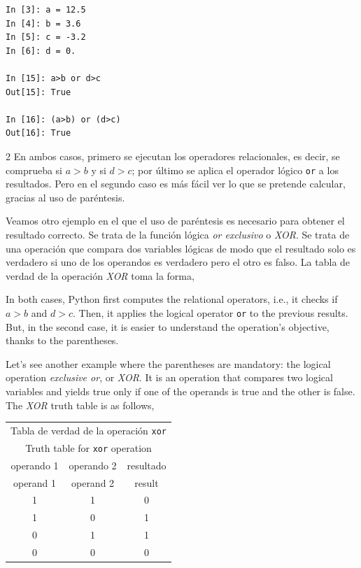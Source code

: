 \begin{center}
    \begin{minipage}{.2\textwidth}
\begin{verbatim}
In [3]: a = 12.5
In [4]: b = 3.6
In [5]: c = -3.2
In [6]: d = 0.

In [15]: a>b or d>c
Out[15]: True

In [16]: (a>b) or (d>c)
Out[16]: True
\end{verbatim}
\end{minipage}
\end{center}

\begin{paracol}{2}
En ambos casos, primero se ejecutan los operadores relacionales, es decir, se comprueba si $a>b$ y si $d>c$; por último se aplica el operador lógico \texttt{or} a los resultados. Pero en el segundo caso es más fácil ver lo que se pretende calcular, gracias al uso de paréntesis.

Veamos otro ejemplo en el que el uso de paréntesis es necesario para obtener el resultado correcto. Se trata de la función lógica \emph{or exclusivo} o \emph{XOR}. Se trata de una operación que compara dos variables lógicas de modo que el resultado solo es verdadero si uno de los operandos es verdadero pero el otro es falso. La tabla de verdad de la operación \emph{XOR} toma la forma,

\switchcolumn
In both cases, Python first computes the relational operators, i.e., it checks if $a>b$ and $d>c$. Then, it applies the logical operator \texttt{or} to the previous results. But, in the second case, it is easier to understand the operation's objective, thanks to the parentheses.

Let's see another example where the parentheses are mandatory: the logical operation \emph{exclusive or}, or \emph{XOR}. It is an operation that compares two logical variables and yields true only if one of the operands is true and the other is false. The \emph{XOR} truth table is as follows, 
\end{paracol}
\begin{table}[h]
\centering
\begin{tabular}{c|c|c}
\multicolumn{3}{c}{Tabla de verdad de la operación \texttt{xor}}\\
\multicolumn{3}{c}{Truth table for \texttt{xor} operation}\\
\hline
\hline
operando 1&operando 2 &resultado\\
operand 1 & operand 2 & result\\
\hline
1&1&0\\
1&0&1\\
0&1&1\\
0&0&0\\ 
\hline
\hline
\end{tabular}
\end{table}
